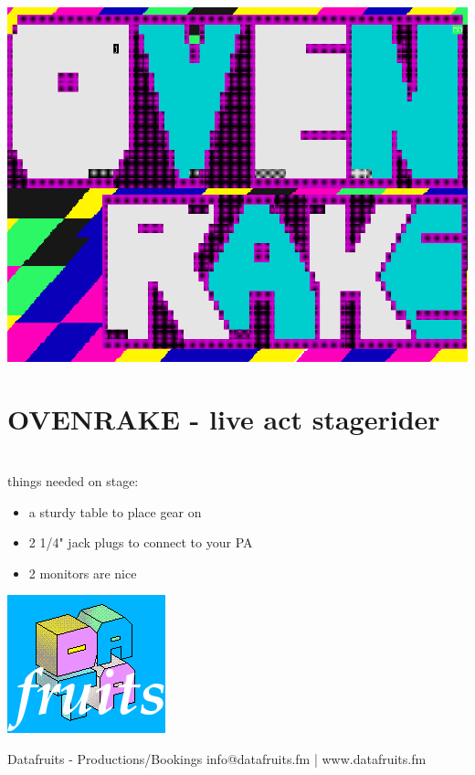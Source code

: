 \documentclass[a4paper,12pt]{article}
\begin{document}
\begin{flushright}
\includegraphics[scale=0.25]{ovenrake.png}
\end{flushright}
\section*{OVENRAKE - live act stagerider}
\ \\
things needed on stage:
\ \\
\begin{itemize}
\item
a sturdy table to place gear on
\item
2 1/4" jack plugs to connect to your PA
\item
2 monitors are nice
\end{itemize}

\begin{flushleft}
\includegraphics[scale=0.25]{datafruits_blue.png}
\end{flushleft}

Datafruits - Productions/Bookings
info@datafruits.fm | www.datafruits.fm
\end{document}
